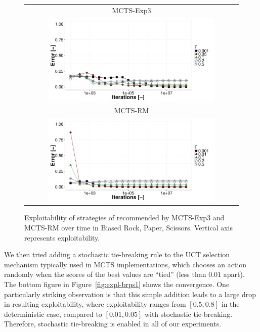 \begin{figure}[t!]
\centering
\begin{tabular}{c}
{\small MCTS-Exp3} \\
\includegraphics[width=0.8\textwidth]{figures/brps-MCTS-EXP3.pdf} \\
{\small MCTS-RM} \\
\includegraphics[width=0.8\textwidth]{figures/brps-MCTS-RM.pdf} \\
\end{tabular}
\caption{Exploitability of strategies of recommended by MCTS-Exp3 and MCTS-RM over time in Biased Rock, Paper, Scissors. Vertical axis represents exploitability. }
\label{fig:expl-brps2}
\end{figure}

We then tried adding a stochastic tie-breaking rule to the UCT selection mechanism typically used in MCTS implementations, which chooses an
action randomly when the scores of the best values are ``tied'' (less than $0.01$ apart).
The bottom figure in Figure~\ref{fig:expl-brps1} shows the convergence.
One particularly striking observation is that this simple addition leads to a large drop in resulting exploitability, where exploitability
ranges from $[0.5,0.8]$ in the deterministic case, compared to $[0.01,0.05]$ with stochastic tie-breaking. Therefore, stochastic tie-breaking is
enabled in all of our experiments.

